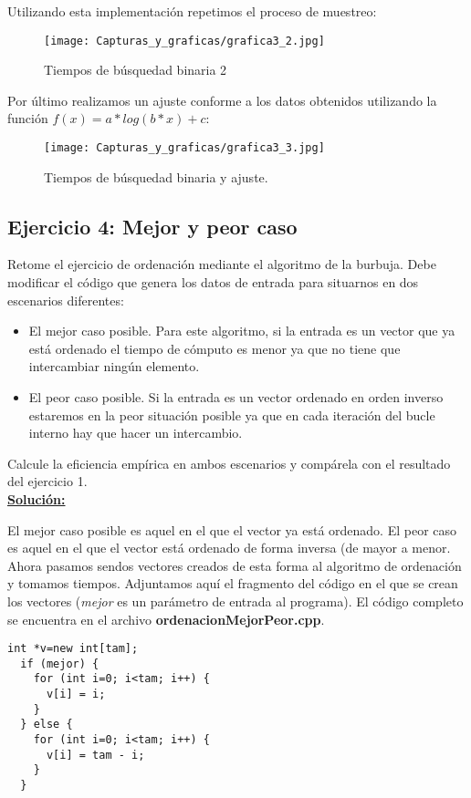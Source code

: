 \documentclass[11pt,a4paper]{article}
\begin{document}
Utilizando esta implementación repetimos el proceso de muestreo:

\begin{figure}[H]
	\centering
	\texttt{[image: Capturas\_y\_graficas/grafica3\_2.jpg]}
	\caption{Tiempos de búsquedad binaria 2}
\end{figure}

Por último realizamos un ajuste conforme a los datos obtenidos utilizando la función $f(x) = a*log(b*x) + c$:

\begin{figure}[H]
	\centering
	\texttt{[image: Capturas\_y\_graficas/grafica3\_3.jpg]}
	\caption{Tiempos de búsquedad binaria y ajuste.}
\end{figure}

\subsection{Ejercicio 4: Mejor y peor caso}
Retome el ejercicio de ordenación mediante el algoritmo de la burbuja. Debe modificar el código que genera los datos de entrada para situarnos en dos escenarios diferentes:
\begin{itemize}
	\item El mejor caso posible. Para este algoritmo, si la entrada es un vector que ya está ordenado el tiempo de cómputo es menor ya que no tiene que intercambiar ningún elemento.
	\item El peor caso posible. Si la entrada es un vector ordenado en orden inverso estaremos en la peor situación posible ya que en cada iteración del bucle interno hay que hacer un intercambio.
\end{itemize}
Calcule la eficiencia empírica en ambos escenarios y compárela con el resultado del ejercicio 1.\\

\textbf{\underline{Solución:}}

El mejor caso posible es aquel en el que el vector ya está ordenado. El peor caso es aquel en el que el vector está ordenado de forma inversa (de mayor a menor. Ahora pasamos sendos vectores creados de esta forma al algoritmo de ordenación y tomamos tiempos. Adjuntamos aquí el fragmento del código en el que se crean los vectores (\emph{mejor} es un parámetro de entrada al programa). El código completo se encuentra en el archivo \textbf{ordenacionMejorPeor.cpp}.

\begin{lstlisting}
int *v=new int[tam];
  if (mejor) {
    for (int i=0; i<tam; i++) {
      v[i] = i;
    }
  } else {
    for (int i=0; i<tam; i++) {
      v[i] = tam - i;
    }
  }
\end{lstlisting}
\end{document}

